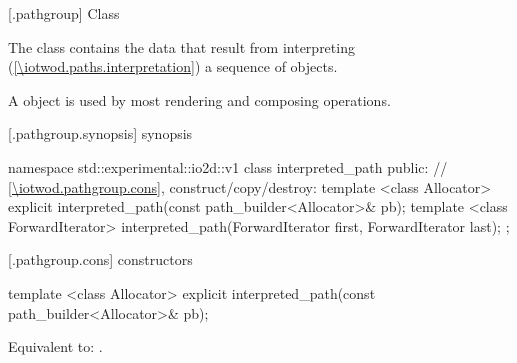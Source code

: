  [\iotwod.pathgroup] {Class }

\pnum
{}%
The class  contains the data that result from interpreting (\ref{\iotwod.paths.interpretation}) a sequence of  objects. %

\pnum
A  object is used by most rendering and composing operations.

%
%
%
%
 [\iotwod.pathgroup.synopsis] { synopsis}

\begin{codeblock}
namespace std::experimental::io2d::v1 {
  class interpreted_path {
    public:
    // \ref{\iotwod.pathgroup.cons}, construct/copy/destroy:
    template <class Allocator>
    explicit interpreted_path(const path_builder<Allocator>& pb);
    template <class ForwardIterator>
    interpreted_path(ForwardIterator first, ForwardIterator last);
  };
}
\end{codeblock}

 [\iotwod.pathgroup.cons] { constructors}

%
\begin{itemdecl}
template <class Allocator>
explicit interpreted_path(const path_builder<Allocator>& pb);
\end{itemdecl}
\begin{itemdescr}
\pnum
\effects
Equivalent to: .	
\end{itemdescr}


